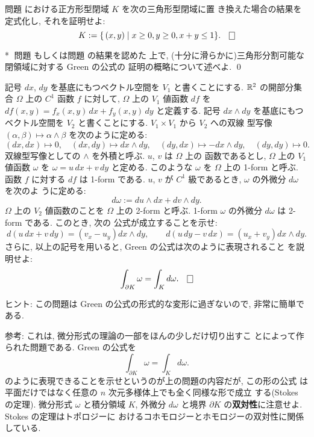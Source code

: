 \documentclass[12pt,twoside]{jarticle}
\def\qstar#1{$\!\!\!$#1$\;$}
\def\R{{\Bbb R}} %
\def\del{\partial}  %
\begin{document}
\begin{question}\label{q:Green2}
  問題  における正方形型閉域 $K$ を次の三角形型閉域に置
  き換えた場合の結果を定式化し, それを証明せよ:
  \[
    K := \{\, (x,y) \mid x \ge 0, y \ge 0, x + y \le 1 \}.
  \qed
  \]
\end{question}

\begin{question}\qstar{*}\label{q:Green3}
  問題  もしくは問題  の結果を認めた
  上で, (十分に滑らかに)三角形分割可能な閉領域に対する Green の公式の
  証明の概略について述べよ. \qed
\end{question}

\begin{question}\label{q:Green4}
  記号 $dx$, $dy$ を基底にもつベクトル空間を %
  $V_1$ と書くことにする.  $\R^2$ の開部分集合 $\Omega$ 上の %
  $C^1$ 函数 $f$ に対して, $\Omega$ 上の $V_1$ 値函数 $df$ を %
  $df(x,y) = f_x(x,y)\,dx + f_y(x,y)\,dy$ と定義する. %
  記号 $dx\wedge dy$ を基底にもつベクトル空間を %
  $V_2$ と書くことにする. $V_1\times V_1$ から $V_2$ への双線
  型写像 $(\alpha,\beta)\mapsto \alpha\wedge\beta$ を次のように定める:
  \[
    (dx,dx) \mapsto 0, \quad
    (dx,dy) \mapsto dx\wedge dy, \quad
    (dy,dx) \mapsto - dx\wedge dy, \quad
    (dy,dy) \mapsto 0.
  \]%
  双線型写像としての $\wedge$ を外積と呼ぶ. $u$, $v$ は $\Omega$ 上の
  函数であるとし, $\Omega$ 上の $V_1$ 値函数 $\omega$ を %
  $\omega = u\,dx + v\,dy$ と定める. このような $\omega$ を $\Omega$ %
  上の 1-form と呼ぶ. 函数 $f$ に対する $df$ は 1-form である. %
  $u$, $v$ が $C^1$ 級であるとき, $\omega$ の外微分 $d\omega$ を次のよ
  うに定める:
  \[
    d\omega := du \wedge dx + dv \wedge dy.
  \]%
  $\Omega$ 上の $V_2$ 値函数のことを $\Omega$ 上の 2-form と呼ぶ. 
  1-form $\omega$ の外微分 $d\omega$ は 2-form である. このとき, 次の
  公式が成立することを示せ:
  \[
    d(u\,dx + v\,dy) = (v_x - u_y) dx\wedge dy,
    \qquad
    d(u\,dy - v\,dx) = (u_x + v_y) dx\wedge dy.
  \]%
  さらに, 以上の記号を用いると, Green の公式は次のように表現されること
  を説明せよ:
  \[
    \int_{\del K} \omega = \int_K d\omega.
  \qed
  \]
\end{question}

\noindent ヒント: この問題は Green の公式の形式的な変形に過ぎないので,
非常に簡単である.

\noindent 参考: これは, 微分形式の理論の一部をほんの少しだけ切り出すこ
とによって作られた問題である. Green の公式を
\[
  \int_{\del K} \omega = \int_K d\omega.
\]%
のように表現できることを示せというのが上の問題の内容だが, この形の公式
は平面だけではなく任意の $n$ 次元多様体上でも全く同様な形で成立
する(Stokes の定理).  %
微分形式 $\omega$ と積分領域 $K$, 外微分 $d\omega$ %
と境界 $\del K$ の{\bf 双対性}に注意せよ. Stokes の定理はトポロジーに
おけるコホモロジーとホモロジーの双対性に関係している.
\end{document}
